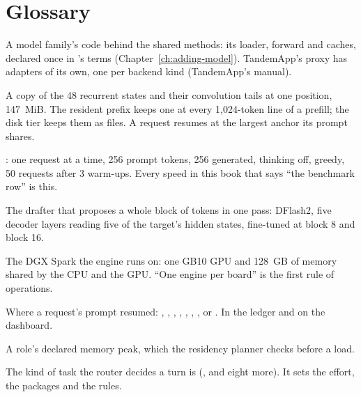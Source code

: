 \chapter{Glossary}\label{ch:glossary}

\begin{description}[style=unboxed, leftmargin=0pt, itemsep=.5ex, font=\normalfont\bfseries]

\item[adapter] A model family's code behind the shared methods: its loader, forward and caches, declared once in 's terms (Chapter~\ref{ch:adding-model}). TandemApp's proxy has adapters of its own, one per backend kind (TandemApp's manual).

\item[anchor] A copy of the 48 recurrent states and their convolution tails at one position, 147~MiB. The resident prefix keeps one at every 1,024-token line of a prefill; the disk tier keeps them as files. A request resumes at the largest anchor its prompt shares.

\item[benchmark row] : one request at a time, 256 prompt tokens, 256 generated, thinking off, greedy, 50 requests after 3 warm-ups. Every speed in this book that says \enquote{the benchmark row} is this.

\item[block drafter] The drafter that proposes a whole block of tokens in one pass: DFlash2, five decoder layers reading five of the target's hidden states, fine-tuned at block 8 and block 16.

\item[board] The DGX Spark the engine runs on: one GB10 GPU and 128~GB of memory shared by the CPU and the GPU. \enquote{One engine per board} is the first rule of operations.

\item[cache source] Where a request's prompt resumed: , , , , , , ,  or . In the ledger and on the dashboard.

\item[claim] A role's declared memory peak, which the residency planner checks before a load.

\item[class] The kind of task the router decides a turn is (,  and eight more). It sets the effort, the packages and the rules.


\end{description}
